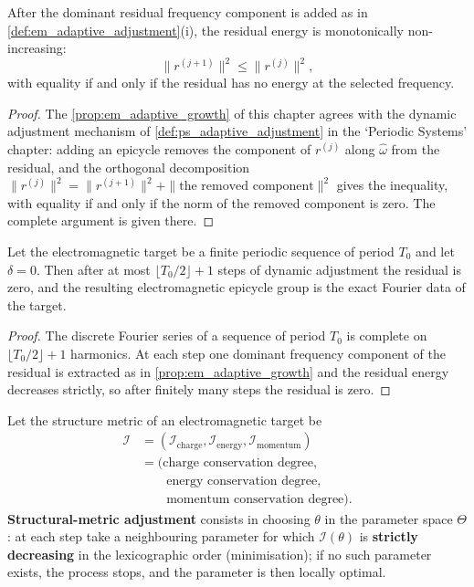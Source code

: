 \begin{proposition}\label{prop:em_adaptive_growth}
After the dominant residual frequency component is added as in \cref{def:em_adaptive_adjustment}(i), the residual energy is monotonically non-increasing:
\[
\|r^{(j+1)}\|^2\le\|r^{(j)}\|^2,
\]
with equality if and only if the residual has no energy at the selected frequency.
\end{proposition}

\begin{proof}
The \cref{prop:em_adaptive_growth} of this chapter agrees with the dynamic adjustment mechanism of \cref{def:ps_adaptive_adjustment} in the `Periodic Systems' chapter:
adding an epicycle removes the component of $r^{(j)}$ along $\hat\omega$ from the residual, and the orthogonal decomposition
$\|r^{(j)}\|^2=\|r^{(j+1)}\|^2+\|\text{the removed component}\|^2$ gives the inequality,
with equality if and only if the norm of the removed component is zero. The complete argument is given there.
\end{proof}

\begin{theorem}\label{thm:em_adaptive_convergence}
Let the electromagnetic target be a finite periodic sequence of period $T_0$ and let $\delta=0$. Then after at most $\lfloor T_0/2\rfloor+1$ steps of dynamic adjustment the residual is zero, and the resulting electromagnetic epicycle group is the exact Fourier data of the target.
\end{theorem}

\begin{proof}
The discrete Fourier series of a sequence of period $T_0$ is complete on $\lfloor T_0/2\rfloor+1$ harmonics. At each step one dominant frequency component of the residual is extracted as in \cref{prop:em_adaptive_growth} and the residual energy decreases strictly, so after finitely many steps the residual is zero.
\end{proof}

\begin{definition}\label{def:em_structure_metric_adjustment}
Let the structure metric of an electromagnetic target be
\[
\begin{aligned}
\mathcal I&=(\mathcal I_{\text{charge}},\mathcal I_{\text{energy}},\mathcal I_{\text{momentum}})\\
&=\bigl(\text{charge conservation degree},\\
&\qquad\text{energy conservation degree},\\
&\qquad\text{momentum conservation degree}\bigr).
\end{aligned}
\]
\textbf{Structural-metric adjustment} consists in choosing $\theta$ in the parameter space $\Theta$: at each step take a neighbouring parameter for which $\mathcal I(\theta)$ is \textbf{strictly decreasing} in the lexicographic order (minimisation); if no such parameter exists, the process stops, and the parameter is then locally optimal.
\end{definition}

